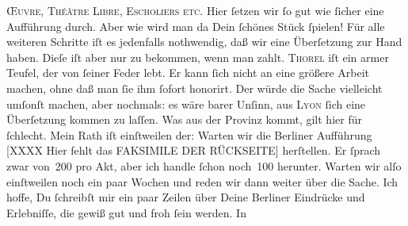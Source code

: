 \begin{ledgroupsized}[t]{13cm}
                  \textsc{Œuvre, Théâtre
                     Libre, Escholiers etc}.  Hier ſetzen wir ſo gut wie ſicher eine Aufführung
               durch. Aber wie wird man da Dein ſchönes Stück ſpielen!\pend
           \pstart
           Für alle weiteren Schritte iſt es  jedenfalls
               nothwendig, daß wir eine Überſetzung zur Hand haben. Dieſe iſt aber nur zu bekommen,
               wenn man zahlt. \textsc{Thorel} iſt ein armer  Teufel, {\pb}der von ſeiner Feder lebt. Er kann
               ſich nicht an eine größere Arbeit machen, ohne daß man ſie ihm ſofort honorirt.  Der \label{K_L02766-123v}\label{K_L02766-123h} würde die Sache vielleicht umſonſt machen, aber nochmals: es wäre barer
               Unſinn, aus \textsc{Lyon} ſich eine Überſetzung kommen zu laſſen.  Was
               aus der Provinz kommt, gilt hier für ſchlecht. Mein Rath iſt einſtweilen der: Warten
               wir die Berliner Aufführung \pend
           \pstart
           {[}XXXX Hier fehlt das FAKSIMILE DER RÜCKSEITE{]}\pend
           \pstart
           {\pb}herſtellen. Er ſprach zwar von 200 pro Akt, aber ich handle ſchon
               noch 100 herunter. Warten wir alſo einſtweilen noch ein paar Wochen\strikeout{\textcolor{gray}{n}} und reden wir dann weiter über die Sache.\pend
           \pstart
           Ich hoffe, Du ſchreibſt mir ein paar Zeilen über Deine Berliner Eindrücke und Erlebniſſe, die gewiß gut und froh ſein werden. In

\end{ledgroupsized}
